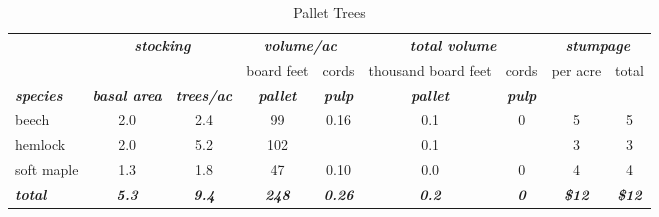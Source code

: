 \documentclass[landscape]{article}
\begin{document}
\begin{table}[H]

\caption{\label{tab:unnamed-chunk-34}Pallet Trees}
\fontsize{10}{12}\selectfont
\begin{tabular}[t]{lcccccccc}
\toprule
\multicolumn{1}{c}{\em{\textbf{ }}} & \multicolumn{2}{c}{\em{\textbf{stocking}}} & \multicolumn{2}{c}{\em{\textbf{volume/ac }}} & \multicolumn{2}{c}{\em{\textbf{total volume}}} & \multicolumn{2}{c}{\em{\textbf{stumpage}}} \\
\cmidrule(l{3pt}r{3pt}){2-3} \cmidrule(l{3pt}r{3pt}){4-5} \cmidrule(l{3pt}r{3pt}){6-7} \cmidrule(l{3pt}r{3pt}){8-9}
\multicolumn{3}{c}{ } & \multicolumn{1}{c}{board feet} & \multicolumn{1}{c}{cords} & \multicolumn{1}{c}{thousand board feet} & \multicolumn{1}{c}{cords} & \multicolumn{1}{c}{per acre} & \multicolumn{1}{c}{total} \\
\cmidrule(l{3pt}r{3pt}){4-4} \cmidrule(l{3pt}r{3pt}){5-5} \cmidrule(l{3pt}r{3pt}){6-6} \cmidrule(l{3pt}r{3pt}){7-7} \cmidrule(l{3pt}r{3pt}){8-8} \cmidrule(l{3pt}r{3pt}){9-9}
\rowcolor[HTML]{DCDCDC}  \em{\textbf{species}} & \em{\textbf{basal area}} & \em{\textbf{trees/ac}} & \em{\textbf{pallet}} & \em{\textbf{pulp}} & \em{\textbf{pallet}} & \em{\textbf{pulp}} & \em{\textbf{ }} & \em{\textbf{ }}\\
\midrule
\rowcolor{gray!6}  beech & 2.0 & 2.4 & 99 & 0.16 & 0.1 & 0 & 5 & 5\\
 
hemlock & 2.0 & 5.2 & 102 &  & 0.1 &  & 3 & 3\\
 
\rowcolor{gray!6}  soft maple & 1.3 & 1.8 & 47 & 0.10 & 0.0 & 0 & 4 & 4\\
 
\rowcolor[HTML]{DCDCDC}  \em{\textbf{total}} & \em{\textbf{5.3}} & \em{\textbf{9.4}} & \em{\textbf{248}} & \em{\textbf{0.26}} & \em{\textbf{0.2}} & \em{\textbf{0}} & \em{\textbf{\$12}} & \em{\textbf{\$12}}\\
\bottomrule
\end{tabular}
\end{table}
\end{document}

